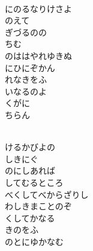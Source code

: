 \documentclass[10pt,b5j]{tarticle} %
\begin{document}
\vspace{1.5em} %
\newcommand{\linespace}{0.5em} %
\newcommand{\blocksize}{0.5\hsize} %
\newcommand{\itemmargin}{3em} %
\begin{enumerate} %
    \setlength{\itemindent}{\itemmargin} %
    \begin{minipage}[c]{\blocksize}
    
        \vspace{\linespace}
        \item~\\
        にのるなりけさよ\\
        のえて\\
        ぎづるのの\\
        ちむ\\
        のははやれゆきぬ\\
        にひにぞかん\\
        れなきをふ\\
        いなるのよ\\
        くがに\\
        ちらん
        
    \end{minipage}
    \begin{minipage}[c]{\blocksize}
        
        \vspace{\linespace}
        \item~\\
        けるかびよの\\
        しきにぐ\\
        のにしあれば\\
        してむるところ\\
        べくしてべからざりし\\
        わしきまことのぞ\\
        くしてかなる\\
        きのをふ\\
        のとにゆかなむ
        

\end{minipage}
\end{enumerate}
\end{document}
